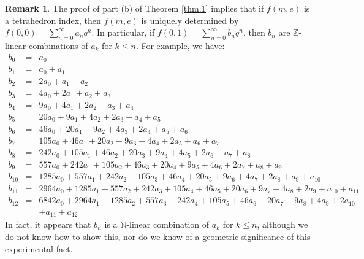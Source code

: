 \documentclass[12pt]{amsart}
\theoremstyle{definition}
\newtheorem{remark}[theorem]{Remark}
\def\BN{\mathbb N}
\def\BZ{\mathbb Z}
\numberwithin{equation}{section}
\begin{document}
\begin{remark}
\label{rem.thm1b}
The proof of part (b) of Theorem \ref{thm.1} implies that if $f(m,e)$
is a tetrahedron index, then $f(m,e)$ is uniquely determined by
$f(0,0)=\sum_{n=0}^\infty a_n q^n$. In particular, if 
$f(0,1)=\sum_{n=0}^\infty b_n q^n$, then $b_n$ are $\BZ$-linear combinations
of $a_k$ for $k \leq n$. For example, we have:
{\small
\begin{eqnarray*}
b_{0} &=&  a_{0}
\\ 
b_{1} &=&  a_{0}+a_{1}
\\ 
b_{2} &=&  2 a_{0}+a_{1}+a_{2}
\\ 
b_{3} &=&  4 a_{0}+2 a_{1}+a_{2}+a_{3}
\\ 
b_{4} &=&  9 a_{0}+4 a_{1}+2 a_{2}+a_{3}+a_{4}
\\ 
b_{5} &=&  20 a_{0}+9 a_{1}+4 a_{2}+2 a_{3}+a_{4}+a_{5}
\\ 
b_{6} &=&  46 a_{0}+20 a_{1}+9 a_{2}+4 a_{3}+2 a_{4}+a_{5}+a_{6}
\\ 
b_{7} &=&  105 a_{0}+46 a_{1}+20 a_{2}+9 a_{3}+4 a_{4}+2 a_{5}+a_{6}+a_{7}
\\ 
b_{8} &=&  242 a_{0}+105 a_{1}+46 a_{2}+20 a_{3}+9 a_{4}+4 a_{5}+2 a_{6}+a_{7}+a_{8}
\\ 
b_{9} &=&  557 a_{0}+242 a_{1}+105 a_{2}+46 a_{3}+20 a_{4}+9 a_{5}+4 a_{6}+2 a_{7}+a_{8}+a_{9}
\\ 
b_{10} &=&  1285 a_{0}+557 a_{1}+242 a_{2}+105 a_{3}+46 a_{4}+20 a_{5}+9 a_{6}+4 a_{7}+2 a_{8}+a_{9}+a_{10}
\\ 
b_{11} &=&  2964 a_{0}+1285 a_{1}+557 a_{2}+242 a_{3}+105 a_{4}+46 a_{5}+20 a_{6}+9 a_{7}+4 a_{8}+2 a_{9}+a_{10}+a_{11}
\\ 
b_{12} &=&  6842 a_{0}+2964 a_{1}+1285 a_{2}+557 a_{3}+242 a_{4}+105 a_{5}+46 a_{6}+20 a_{7}+9 a_{8}+4 a_{9}+2 a_{10} \\ & & +a_{11}+a_{12}
\end{eqnarray*}
}
In fact, it appears that $b_n$ is a $\BN$-linear combination of
 $a_k$ for $k \leq n$, although we do not know how to show this, nor
do we know of a geometric significance of this experimental fact.
\end{remark}
\end{document}
